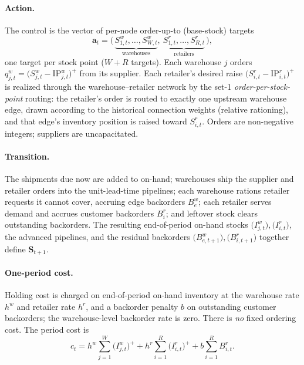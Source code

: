 \paragraph{Action.}
The control is the vector of per-node order-up-to (base-stock) targets
\begin{equation*}
  \mathbf a_t = \big(\,\underbrace{S^w_{1,t},\dots,S^w_{W,t}}_{\text{warehouses}},\
  \underbrace{S^r_{1,t},\dots,S^r_{R,t}}_{\text{retailers}}\,\big),
\end{equation*}
one target per stock point ($W+R$ targets). Each warehouse $j$ orders
$q^w_{j,t}=\big(S^w_{j,t}-\mathrm{IP}^w_{j,t}\big)^+$ from its supplier. Each retailer's desired raise
$\big(S^r_{i,t}-\mathrm{IP}^r_{i,t}\big)^+$ is realized through the warehouse--retailer network by the
set-1 \emph{order-per-stock-point} routing: the retailer's order is routed to exactly one upstream
warehouse edge, drawn according to the historical connection weights (relative rationing), and that
edge's inventory position is raised toward $S^r_{i,t}$. Orders are non-negative integers; suppliers are
uncapacitated.

\paragraph{Transition.}
The shipments due now are added to on-hand; warehouses ship the supplier and retailer orders into the
unit-lead-time pipelines; each warehouse rations retailer requests it cannot cover, accruing edge
backorders $B^w_{e}$; each retailer serves demand and accrues customer backorders $B^r_{i}$; and
leftover stock clears outstanding backorders. The resulting end-of-period on-hand stocks
$\big(I^w_{j,t}\big),\big(I^r_{i,t}\big)$, the advanced pipelines, and the residual backorders
$\big(B^w_{e,t+1}\big),\big(B^r_{i,t+1}\big)$ together define $\mathbf S_{t+1}$.

\paragraph{One-period cost.}
Holding cost is charged on end-of-period on-hand inventory at the warehouse rate $h^w$ and retailer
rate $h^r$, and a backorder penalty $b$ on outstanding customer backorders; the warehouse-level
backorder rate is zero. There is \emph{no} fixed ordering cost. The period cost is
\begin{equation}
  c_t = h^w\sum_{j=1}^{W}\big(I^w_{j,t}\big)^+ + h^r\sum_{i=1}^{R}\big(I^r_{i,t}\big)^+
        + b\sum_{i=1}^{R} B^r_{i,t} .
  \label{eq:gbk-cost}
\end{equation}

